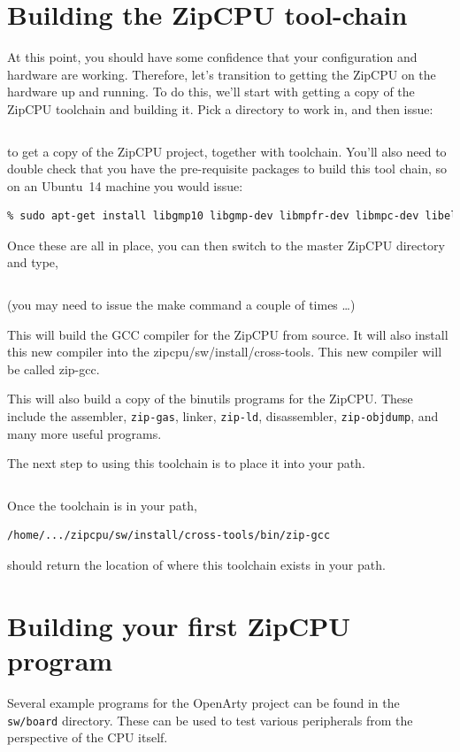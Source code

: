 \documentclass{gqtekspec}
\begin{document}
\section{Building the ZipCPU tool-chain}
At this point, you should have some confidence that your configuration and
hardware are working.  Therefore, let's transition to getting the ZipCPU
on the hardware up and running. 
To do this, we'll start with getting a copy
of the ZipCPU toolchain and building it.  Pick a directory to work in, and
then issue:
\begin{lstlisting}[language=bash]
% git clone https://github.com/ZipCPU/zipcpu
\end{lstlisting}
to get a copy of the ZipCPU project, together with toolchain.  You'll also
need to double check that you have the pre-requisite packages to build this
tool chain, so on an Ubuntu~14 machine you would issue:
\begin{lstlisting}[language=bash]
% sudo apt-get install flex bison libbison-dev
% sudo apt-get install libgmp10 libgmp-dev libmpfr-dev libmpc-dev libelf-dev
\end{lstlisting}
Once these are all in place, you can then switch to the master ZipCPU
directory and type,
\begin{lstlisting}[language=bash]
% cd zipcpu; make
\end{lstlisting}
(you may need to issue the make command a couple of times \ldots)

This will build the GCC compiler for the ZipCPU from source.  
It will also install this new compiler into the zipcpu/sw/install/cross-tools.
This new compiler will be called zip-gcc.

This will also build a copy of the binutils programs for the ZipCPU.  These
include the assembler, {\tt zip-gas}, linker, {\tt zip-ld}, disassembler,
{\tt zip-objdump}, and many more useful programs.

The next step to using this toolchain is to place it into your path.
\begin{lstlisting}[language=bash]
% export PATH=$PATH:$PWD/zipcpu/install/cross-tools/bin
\end{lstlisting}
Once the toolchain is in your path,
\begin{lstlisting}[language=bash]
% which zip-gcc
/home/.../zipcpu/sw/install/cross-tools/bin/zip-gcc
\end{lstlisting}
should return the location of where this toolchain exists in your path.

\section{Building your first ZipCPU program}
Several example programs for the OpenArty project can be found in the
{\tt sw/board} directory.  These can be used to test various peripherals from
the perspective of the CPU itself.
\end{document}
